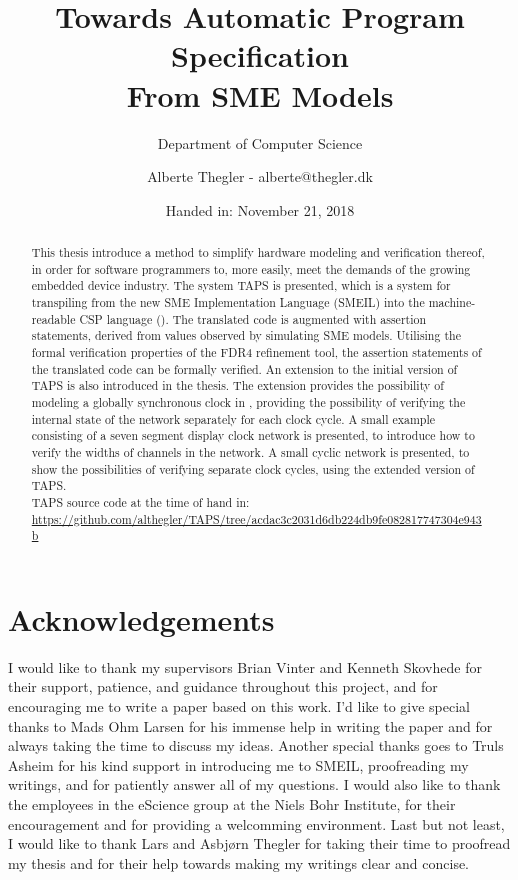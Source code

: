 \documentclass[a4paper]{report}
\author{Alberte Thegler - alberte@thegler.dk}
\title{Towards Automatic Program Specification \\ From SME Models}
\subtitle{Department of Computer Science}
\date{Handed in: November 21, 2018}
\begin{document}
\maketitle



\begin{abstract}
\begin{doublespace}
This thesis introduce a method to simplify hardware modeling and verification
thereof, in order for software programmers to, more easily, meet the demands of
the growing embedded device industry. The system TAPS is presented, which is a
system for transpiling from the new SME Implementation Language (SMEIL) into the
machine-readable CSP language (\cspm{}).
The translated \cspm{} code is augmented with assertion statements, derived from values observed by simulating SME models. Utilising the formal verification
properties of the FDR4 refinement tool, the assertion statements of the
translated \cspm{} code can be formally verified.
An extension to the initial version of TAPS is also introduced in the thesis. The extension provides the possibility of modeling a globally synchronous clock in
\cspm{}, providing the possibility of verifying the internal state of the
\cspm{} network separately for each clock cycle.
A small example consisting of a
seven segment display clock network is presented, to introduce how to verify the
widths of channels in the network. A small cyclic network is presented, to
show the possibilities of verifying separate clock cycles, using the extended
version of TAPS.\\

TAPS source code at the time of hand in:\\ \url{https://github.com/althegler/TAPS/tree/acdac3c2031d6db224db9fe082817747304e943b}
\end{doublespace}
\end{abstract}

\chapter*{Acknowledgements}
I would like to thank my supervisors Brian Vinter and Kenneth Skovhede for their support, patience, and guidance throughout this project, and for encouraging me to write a paper based on this work.
I'd like to give special thanks to Mads Ohm Larsen for his immense help in writing the paper and for always taking the time to discuss my ideas.
Another special thanks goes to Truls Asheim for his kind support in introducing me to SMEIL, proofreading my writings, and for patiently answer all of my questions.
I would also like to thank the employees in the eScience group at the Niels Bohr Institute, for their encouragement and for providing a welcomming environment.
Last but not least, I would like to thank Lars and Asbj\o rn Thegler for taking their time to proofread my thesis and for their help towards making my writings clear and concise.
\end{document}
